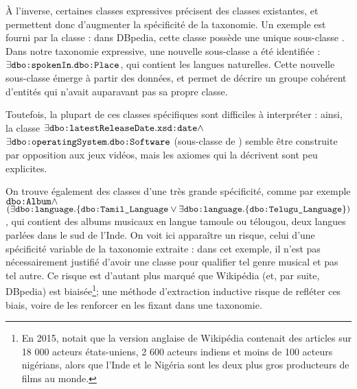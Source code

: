 À l'inverse, certaines classes expressives précisent des classes existantes, et permettent donc d'augmenter la spécificité de la taxonomie. Un exemple est fourni par la classe  : dans DBpedia, cette classe possède une unique sous-classe . Dans notre taxonomie expressive, une nouvelle sous-classe a été identifiée : $\exists \texttt{dbo:spokenIn}.\texttt{dbo:Place}$, qui contient les langues naturelles. Cette nouvelle sous-classe émerge à partir des données, et permet de décrire un groupe cohérent d'entités qui n'avait auparavant pas sa propre classe.

Toutefois, la plupart de ces classes spécifiques sont difficiles à interpréter : ainsi, la classe $\exists \texttt{dbo:latestReleaseDate}.\texttt{xsd:date} \land$ $\exists \texttt{dbo:operatingSystem} \allowbreak .\texttt{dbo:Software}$ (sous-classe de ) semble être construite par opposition aux jeux vidéos, mais les axiomes qui la décrivent sont peu explicites.
%

On trouve également des classes d'une très grande spécificité, comme par exemple $\texttt{dbo:Album}  \allowbreak \land$ $(\exists \allowbreak  \texttt{dbo:language} . \allowbreak \{ \texttt{dbo:Tamil\_Language}  \allowbreak\lor \allowbreak \exists \texttt{dbo:language}. \allowbreak \{ \texttt{dbo:Telugu\_Language} \}) $, qui contient des albums musicaux en langue tamoule ou télougou, deux langues parlées dans le sud de l'Inde. On voit ici apparaître un risque, celui d'une spécificité variable de la taxonomie extraite : dans cet exemple, il n'est pas nécessairement justifié d'avoir une classe pour qualifier tel genre musical et pas tel autre. 
Ce risque est d'autant plus marqué que Wikipédia (et, par suite, DBpedia) est biaisée\footnote{En 2015, \cite{nickel2015review} notait que la version anglaise de Wikipédia contenait des articles sur 18 000 acteurs états-uniens, 2 600 acteurs indiens et moins de 100 acteurs nigérians, alors que l'Inde et le Nigéria sont les deux plus gros producteurs de films au monde.}; une méthode d'extraction inductive risque de refléter ces biais, voire de les renforcer en les fixant dans une taxonomie.

